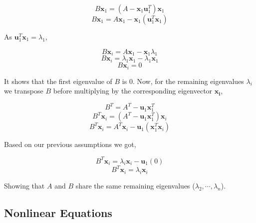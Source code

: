 \documentclass{article}
\renewcommand{\vec}[1]{\mathbf{#1}}
\begin{document}
\begin{enumerate}
\begin{enumerate}
$$B\vec{x}_1=(A-\vec{x}_1\vec{u}_1^T)\vec{x}_1$$
$$B\vec{x}_1=A\vec{x}_1-\vec{x}_1(\vec{u}_1^T\vec{x}_1)$$

As $\vec{u}_1^T\vec{x}_1 = \lambda_1$,

$$B\vec{x}_i=A\vec{x}_1-\vec{x}_1\lambda_1$$
$$B\vec{x}_i=\lambda_1\vec{x}_1-\lambda_1\vec{x}_1$$
$$B\vec{x}_i=0$$

It shows that the first eigenvalue of $B$ is $0$.  Now, for the remaining eigenvalues $\lambda_i$ we transpose $B$ before multiplying by the corresponding eigenvector $\vec{x_i}$,

$$B^T=A^T-\vec{u}_1\vec{x}_1^T$$
$$B^T\vec{x}_i=(A^T-\vec{u}_1\vec{x}_1^T)\vec{x}_i$$
$$B^T\vec{x}_i=A^T\vec{x}_i-\vec{u}_1(\vec{x}_1^T\vec{x}_i)$$

Based on our previous assumptions we got,

$$B^T\vec{x}_i=\lambda_i\vec{x}_i-\vec{u}_1(0)$$
$$B^T\vec{x}_i=\lambda_i\vec{x}_i$$

Showing that $A$ and $B$ share the same remaining eigenvalues ($\lambda_2, \cdots, \lambda_n$). 

\end{enumerate}

\end{enumerate}

\subsection*{Nonlinear Equations}
\end{document}

